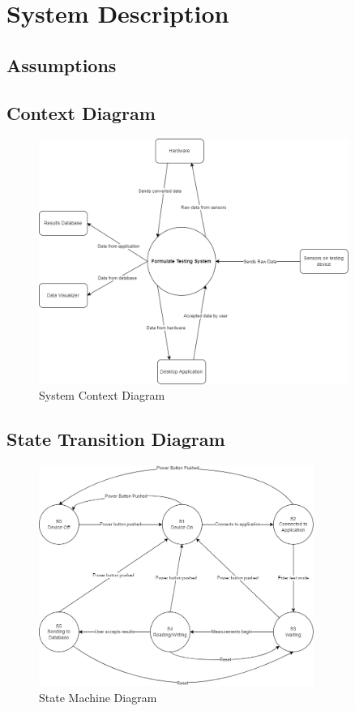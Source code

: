 \documentclass[12pt]{article}
\begin{document}
\section{System Description}

\subsection{Assumptions}

\subsection{Context Diagram}
\begin{figure}[h!]
\begin{center}
\includegraphics[width=0.9\textwidth]{sys_context_diagram}
\caption{System Context Diagram}
\label{Fig_SystemContext} 
\end{center}
\end{figure}

\subsection{State Transition Diagram}
\begin{figure}[h!]
\begin{center}
\includegraphics[width=0.8\textwidth]{state_machine_diagram}
\caption{State Machine Diagram}
\label{Fig_StateMachineDiagram} 
\end{center}
\end{figure}
\end{document}
